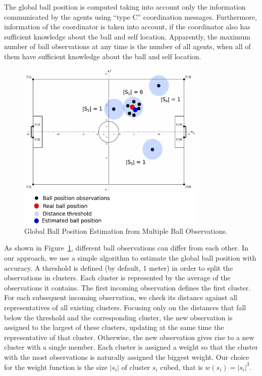 The global ball position is computed taking into account only the information communicated by the agents using ``type C'' coordination messages. Furthermore, information of the coordinator is taken into account, if the coordinator also has sufficient knowledge about the ball and self location. Apparently, the maximum number of ball observations at any time is the number of all agents, when all of them have sufficient knowledge about the ball and self location.
\begin{figure}[t!]
\centering
  \includegraphics[width=0.8\textwidth]{Chapter4/figures/Ball.pdf}
  \caption{Global Ball Position Estimation from Multiple Ball Observations.} 
  \label{fig:Ball}
\end{figure}
As shown in Figure~\ref{fig:Ball}, different ball observations can differ from each other. In our approach, we use a simple algorithm to estimate the global ball position with accuracy. A threshold is defined (by default, 1 meter) in order to split the observations in clusters. %
Each cluster is represented by the average of the observations it contains. The first incoming observation defines the first cluster. For each subsequent incoming observation, we check its distance against all representatives of all existing clusters. Focusing only on the distances that fall below the threshold and the corresponding cluster, the new observation is assigned to the largest of these clusters, updating at the same time the representative of that cluster. Otherwise, the new observation gives rise to a new cluster with a single member. Each cluster is assigned a weight so that the cluster with the most observations is naturally assigned the biggest weight. Our choice for the weight function is the size $|s_i|$ of cluster $s_i$ cubed, that is $w(s_i) = |s_i|^3$.
